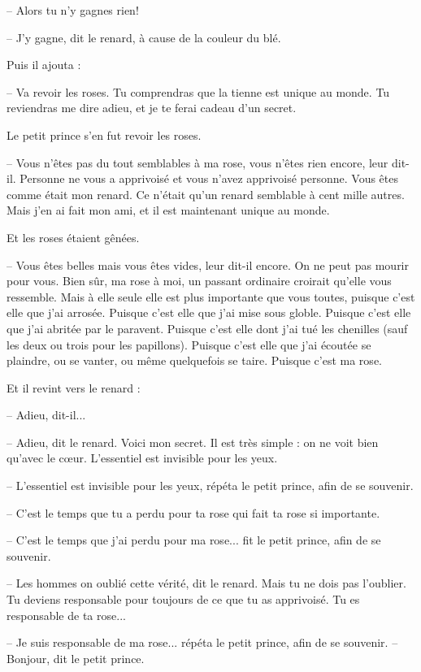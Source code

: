 \documentclass[a4paper]{report}
\begin{document}
-- Alors tu n'y gagnes rien!

-- J'y gagne, dit le renard, à cause de la couleur du blé.

Puis il ajouta :

-- Va revoir les roses. Tu comprendras que la tienne est unique au monde. Tu reviendras me dire adieu, et je te ferai cadeau d'un secret.

Le petit prince s'en fut revoir les roses.

-- Vous n'êtes pas du tout semblables à ma rose, vous n'êtes rien encore, leur dit-il. Personne ne vous a apprivoisé et vous n'avez apprivoisé personne. Vous êtes comme était mon renard. Ce n'était qu'un renard semblable à cent mille autres. Mais j'en ai fait mon ami, et il est maintenant unique au monde.

Et les roses étaient gênées.

-- Vous êtes belles mais vous êtes vides, leur dit-il encore. On ne peut pas mourir pour vous. Bien sûr, ma rose à moi, un passant ordinaire croirait qu'elle vous ressemble. Mais à elle seule elle est plus importante que vous toutes, puisque c'est elle que j'ai arrosée. Puisque c'est elle que j'ai mise sous globle. Puisque c'est elle que j'ai abritée par le paravent. Puisque c'est elle dont j'ai tué les chenilles (sauf les deux ou trois pour les papillons). Puisque c'est elle que j'ai écoutée se plaindre, ou se vanter, ou même quelquefois se taire. Puisque c'est ma rose.

Et il revint vers le renard :

-- Adieu, dit-il...

-- Adieu, dit le renard. Voici mon secret. Il est très simple : on ne voit bien qu'avec le cœur. L'essentiel est invisible pour les yeux.

-- L'essentiel est invisible pour les yeux, répéta le petit prince, afin de se souvenir.

-- C'est le temps que tu a perdu pour ta rose qui fait ta rose si importante.

-- C'est le temps que j'ai perdu pour ma rose... fit le petit prince, afin de se souvenir.

-- Les hommes on oublié cette vérité, dit le renard. Mais tu ne dois pas l'oublier. Tu deviens responsable pour toujours de ce que tu as apprivoisé. Tu es responsable de ta rose...

-- Je suis responsable de ma rose... répéta le petit prince, afin de se souvenir.
\parachapter{} %
-- Bonjour, dit le petit prince.
\end{document}
